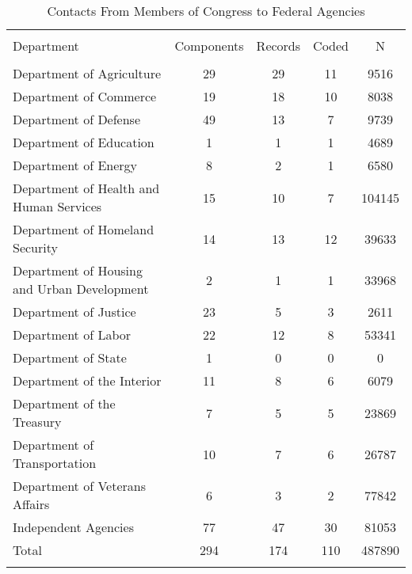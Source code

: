 
\begin{table}[!htbp] \centering 
  \caption{Contacts From Members of Congress to Federal Agencies} 
  \label{responserates} 
\begin{tabular}{@{\extracolsep{5pt}} lcccc} 
\\[-1.8ex]\hline \\[-1.8ex] 
Department & Components & Records & Coded & N \\ 
\hline \\[-1.8ex] 
Department of Agriculture & 29 & 29 & 11 & 9516 \\ 
Department of Commerce & 19 & 18 & 10 & 8038 \\ 
Department of Defense & 49 & 13 & 7 & 9739 \\ 
Department of Education & 1 & 1 & 1 & 4689 \\ 
Department of Energy & 8 & 2 & 1 & 6580 \\ 
Department of Health and Human Services & 15 & 10 & 7 & 104145 \\ 
Department of Homeland Security & 14 & 13 & 12 & 39633 \\ 
Department of Housing and Urban Development & 2 & 1 & 1 & 33968 \\ 
Department of Justice & 23 & 5 & 3 & 2611 \\ 
Department of Labor & 22 & 12 & 8 & 53341 \\ 
Department of State & 1 & 0 & 0 & 0 \\ 
Department of the Interior & 11 & 8 & 6 & 6079 \\ 
Department of the Treasury & 7 & 5 & 5 & 23869 \\ 
Department of Transportation & 10 & 7 & 6 & 26787 \\ 
Department of Veterans Affairs & 6 & 3 & 2 & 77842 \\ 
Independent Agencies & 77 & 47 & 30 & 81053 \\ 
Total & 294 & 174 & 110 & 487890 \\ 
\hline \\[-1.8ex] 
\end{tabular} 
\end{table} 